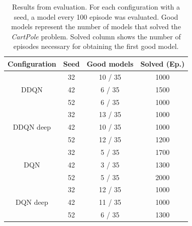 \begin{table}
	\centering
	\begin{tabular}{|c|c|c|c|}
		\hline
		\textbf{Configuration} & \textbf{Seed} & \textbf{Good models} & \textbf{Solved (Ep.)} \\
		\hline
			 & 32 & 10 / 35 & 1000 \\
		DDQN & 42 & 6 / 35 & 1500 \\
			 & 52 & 6 / 35 & 1000 \\
		\hline
		 		& 32 & 13 / 35 & 1000 \\
		DDQN deep  & 42 & 10 / 35 & 1000 \\
				  & 52 & 12 / 35 & 1200 \\
		\hline
			& 32 & 5 / 35 & 1700 \\
		DQN	& 42 & 3 / 35 & 1300 \\
			& 52 & 5 / 35 & 2000 \\
		\hline
				 & 32 & 12 / 35 & 1000 \\
		DQN deep & 42 & 11 / 35 & 1000 \\
				 & 52 & 6 / 35 & 1300 \\
		\hline
	\end{tabular}
	\caption{Results from evaluation. For each configuration with a seed, a model every 100 episode was evaluated. Good models represent the number of models that solved the \textit{CartPole} problem. Solved column shows the number of episodes necessary for obtaining the first good model.}
	\label{tab:comparison_table}
\end{table}
